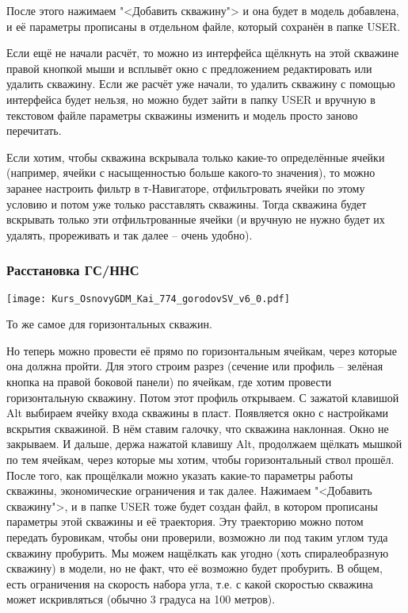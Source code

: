 \documentclass[main.tex]{subfiles}
\begin{document}
После этого нажимаем "<Добавить скважину"> и она будет в модель добавлена, и её параметры прописаны в отдельном файле, который сохранён в папке USER.

Если ещё не начали расчёт, то можно из интерфейса щёлкнуть на этой скважине правой кнопкой мыши и всплывёт окно с предложением редактировать или удалить скважину.
Если же расчёт уже начали, то удалить скважину с помощью интерфейса будет нельзя, но можно будет зайти в папку USER и вручную в текстовом файле параметры скважины изменить и модель просто заново перечитать.

Если хотим, чтобы скважина вскрывала только какие-то определённые ячейки (например, ячейки с насыщенностью больше какого-то значения), то можно заранее настроить фильтр в т-Навигаторе, отфильтровать ячейки по этому условию и потом уже только расставлять скважины.
Тогда скважина будет вскрывать только эти отфильтрованные ячейки (и вручную не нужно будет их удалять, прореживать и так далее -- очень удобно).

\subsubsection{Расстановка ГС/ННС}

\texttt{[image: Kurs\_OsnovyGDM\_Kai\_774\_gorodovSV\_v6\_0.pdf]}

То же самое для горизонтальных скважин.

Но теперь можно провести её прямо по горизонтальным ячейкам, через которые она должна пройти.
Для этого строим разрез (сечение или профиль -- зелёная кнопка на правой боковой панели) по ячейкам, где хотим провести горизонтальную скважину.
Потом этот профиль открываем.
С зажатой клавишой Alt выбираем ячейку входа скважины в пласт.
Появляется окно с настройками вскрытия скважиной.
В нём ставим галочку, что скважина наклонная.
Окно не закрываем.
И дальше, держа нажатой клавишу Alt, продолжаем щёлкать мышкой по тем ячейкам, через которые мы хотим, чтобы горизонтальный ствол прошёл.
После того, как прощёлкали можно указать какие-то параметры работы скважины, экономические ограничения и так далее.
Нажимаем "<Добавить скважину">, и в папке USER тоже будет создан файл, в котором прописаны параметры этой скважины и её траектория.
Эту траекторию можно потом передать буровикам, чтобы они проверили, возможно ли под таким углом туда скважину пробурить.
Мы можем нащёлкать как угодно (хоть спиралеобразную скважину) в модели, но не факт, что её возможно будет пробурить.
В общем, есть ограничения на скорость набора угла, т.е. с какой скоростью скважина может искривляться (обычно 3 градуса на 100 метров).
\end{document}
